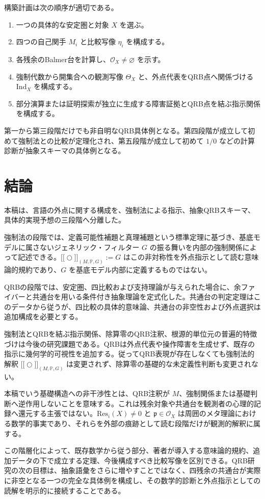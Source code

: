 \documentclass[a4paper,11pt]{ltjsarticle}
\theoremstyle{definition}
\theoremstyle{plain}
\newcommand{\Res}{\mathrm{Res}}
\newcommand{\Ind}{\mathrm{Ind}}
\newcommand{\dfix}{\bigcirc}
\newcommand{\sem}[1]{\mathopen{[\![}#1\mathclose{]\!]}}
\begin{document}
構築計画は次の順序が適切である。
\begin{enumerate}
 \item 一つの具体的な安定圏と対象 $X$ を選ぶ。
 \item 四つの自己関手 $M_i$ と比較写像 $\eta_i$ を構成する。
 \item 各残余のBalmer台を計算し、$\mathcal O_X\neq\varnothing$ を示す。
 \item 強制代数から開集合への観測写像 $\Theta_X$ と、外点代表をQRB点へ関係づける $\Ind_X$ を構成する。
 \item 部分演算または証明探索が独立に生成する障害証拠とQRB点を結ぶ指示関係を構成する。
\end{enumerate}

第一から第三段階だけでも非自明なQRB具体例となる。第四段階が成立して初めて強制法との比較が定理化され、第五段階が成立して初めて $1/0$ などの計算診断が抽象スキーマの具体例となる。

\section{結論}

本稿は、言語の外点に関する構成を、強制法による指示、抽象QRBスキーマ、具体的実現予想の三段階へ分離した。

強制法の段階では、定義可能性補題と真理補題という標準定理に基づき、基底モデルに属さないジェネリック・フィルター $G$ の振る舞いを内部の強制関係によって記述できる。$\sem{\dfix}_{(M,\mathbb P,G)}:=G$ はこの非対称性を外点指示として読む意味論的規約であり、$G$ を基底モデル内部に定義するものではない。

QRBの段階では、安定圏、四比較および支持理論が与えられた場合に、余ファイバーと共通台を用いる条件付き抽象理論を定式化した。共通台の判定定理はこのデータから従うが、四比較の具体的意味論、共通台の非空性および外点選択は追加構成を必要とする。

強制法とQRBを結ぶ指示関係、除算零のQRB注釈、根源的単位元の普遍的特徴づけは今後の研究課題である。QRBは外点代表や操作障害を生成せず、既存の指示に幾何学的可視性を追加する。従ってQRB表現が存在しなくても強制法的解釈 $\sem{\dfix}_{(M,\mathbb P,G)}$ は変更されず、除算零の基礎的な未定義性判断も変更されない。

本稿でいう基礎構造への非干渉性とは、QRB注釈が $M$、強制関係または基礎判断へ逆作用しないことを意味する。これは残余対象や共通台を観測者の心理的記録へ還元する主張ではない。$\Res_i(X)\neq0$ と $\mathfrak p\in\mathcal O_X$ は周囲のメタ理論における数学的事実であり、それらを外部の痕跡として読む段階だけが観測的解釈に属する。

この階層化によって、既存数学から従う部分、著者が導入する意味論的規約、追加データの下で成立する定理、今後構成すべき比較写像を区別できる。QRB研究の次の目標は、抽象語彙をさらに増やすことではなく、四残余の共通台が実際に非空となる一つの完全な具体例を構成し、その数学的診断と外点指示としての読解を明示的に接続することである。



\end{document}
